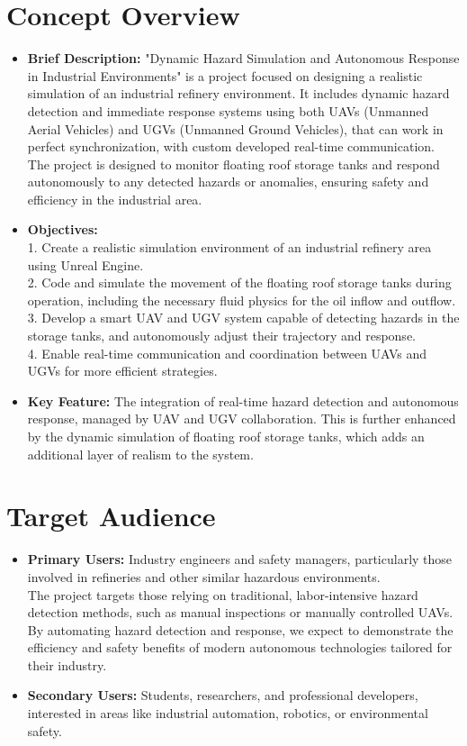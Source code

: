\documentclass{article}
\begin{document}
\section{Concept Overview}
\begin{itemize} 
    \item \textbf{Brief Description:} "Dynamic Hazard Simulation and Autonomous Response in Industrial Environments" is a project focused on designing a realistic simulation of an industrial refinery environment. It includes dynamic hazard detection and immediate response systems using both UAVs (Unmanned Aerial Vehicles) and UGVs (Unmanned Ground Vehicles), that can work in perfect synchronization, with custom developed real-time communication. The project is designed to monitor floating roof storage tanks and respond autonomously to any detected hazards or anomalies, ensuring safety and efficiency in the industrial area.

    \item \textbf{Objectives:} 
    \\
1. Create a realistic simulation environment of an industrial refinery area using Unreal Engine.
\\
2. Code and simulate the movement of the floating roof storage tanks during operation, including the necessary fluid physics for the oil inflow and outflow.
\\
3. Develop a smart UAV and UGV system capable of detecting hazards in the storage tanks, and autonomously adjust their trajectory and response.
\\
4. Enable real-time communication and coordination between UAVs and UGVs for more efficient strategies.

    \item \textbf{Key Feature:} The integration of real-time hazard detection and autonomous response, managed by UAV and UGV collaboration. This is further enhanced by the dynamic simulation of floating roof storage tanks, which adds an additional layer of realism to the system.
\end{itemize}

\section{Target Audience}
\begin{itemize}
    \item \textbf{Primary Users:} Industry engineers and safety managers, particularly those involved in refineries and other similar hazardous environments. 
\\
The project targets those relying on traditional, labor-intensive hazard detection methods, such as manual inspections or manually controlled UAVs. By automating hazard detection and response, we expect to demonstrate the efficiency and safety benefits of modern autonomous technologies tailored for their industry.
    \item \textbf{Secondary Users:} Students, researchers, and professional developers, interested in areas like industrial automation, robotics, or environmental safety.
\end{itemize}
\end{document}
